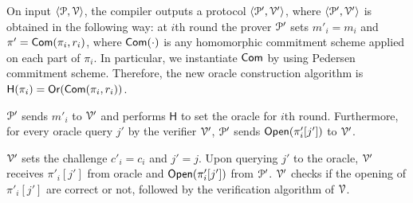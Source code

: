 On input $\langle \mathcal{P}, \mathcal{V} \rangle$, the compiler outputs a protocol $\langle \mathcal{P}', \mathcal{V}' \rangle$, where $\langle \mathcal{P}', \mathcal{V}' \rangle$ is obtained in the following way:
at $i$th round the prover $\mathcal{P}'$ sets $m'_i = m_i$ and $\pi' = \mathsf{Com}(\pi_i, r_i)$, where $\mathsf{Com}(\cdot)$ is any homomorphic commitment scheme applied on each part of $\pi_i$. In particular, we instantiate $\mathsf{Com}$ by using Pedersen commitment scheme. Therefore, the new oracle construction algorithm is $\mathsf{H}(\pi_i) = \mathsf{Or}(\mathsf{Com}(\pi_i, r_i))$.

$\mathcal{P}'$ sends $m'_i$ to $\mathcal{V}'$ and performs $\mathsf{H}$ to set the oracle for $i$th round. Furthermore, for every oracle query $j'$ by the verifier $\mathcal{V}'$, $\mathcal{P}'$ sends $\mathsf{Open}(\pi'_i[j'])$ to $\mathcal{V}'$.

$\mathcal{V}'$ sets the challenge $c'_i = c_i$ and $j' = j$. Upon querying $j'$ to the oracle, $\mathcal{V}'$ receives $\pi'_i[j']$ from oracle and $\mathsf{Open}(\pi'_i[j'])$ from $\mathcal{P}'$. $\mathcal{V}'$ checks if the opening of $\pi'_i[j']$ are correct or not, followed by the verification algorithm of $\mathcal{V}$. 

